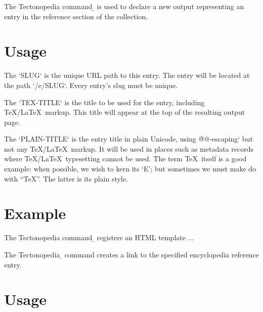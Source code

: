
The Tectonopedia command \b{\string\Entry} is used to declare a new output
representing an entry in the reference section of the collection.

\section*{Usage}

\begin{texdisp}
\end{texdisp}

The \tex`SLUG` is the unique URL path to this entry. The entry will be located
at the path \tex`/e/{SLUG}`. Every entry's slug must be unique.

The \tex`TEX-TITLE` is the title to be used for the entry, including
\TeX/\LaTeX\ markup. This title will appear at the top of the resulting output
page.

The \tex`PLAIN-TITLE` is the entry title in plain Unicode, using \`@@-escaping`
but not any \TeX/\LaTeX\ markup. It will be used in places such as metadata
records where \TeX/\LaTeX\ typesetting cannot be used. The term \TeX\ itself is
a good example: when possible, we wish to kern its ‘E’; but sometimes we must
make do with “TeX”. The latter is its plain style.


\section*{Example}

\begin{texdisp}

The Tectonopedia command \b{\string\tduxAddTemplate} registers an HTML template ...
\end{texdisp}



The Tectonopedia \b{\string\e} command creates a link to the specified
encyclopedia reference entry.

\section*{Usage}

\begin{texdisp}
\end{texdisp}

